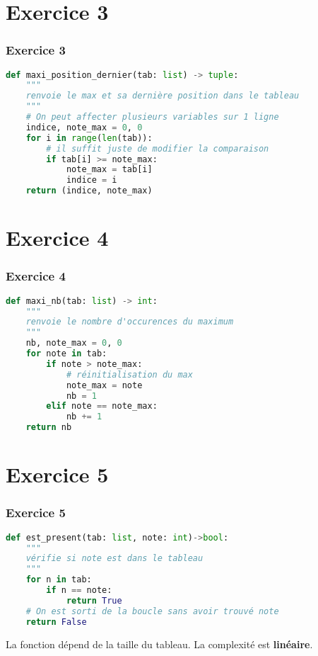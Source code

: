 \documentclass[svgnames,11pt]{beamer}
\begin{document}
\section{Exercice 3}
\begin{frame}[fragile]
    \frametitle{Exercice 3}

\begin{center}
\begin{lstlisting}[language=Python , basicstyle=\ttfamily\small, xleftmargin=2em, xrightmargin=1em]
def maxi_position_dernier(tab: list) -> tuple:
    """
    renvoie le max et sa dernière position dans le tableau
    """
    # On peut affecter plusieurs variables sur 1 ligne
    indice, note_max = 0, 0
    for i in range(len(tab)):
        # il suffit juste de modifier la comparaison
        if tab[i] >= note_max:
            note_max = tab[i]
            indice = i
    return (indice, note_max)
\end{lstlisting}
\end{center}    

\end{frame}
\section{Exercice 4}
\begin{frame}[fragile]
    \frametitle{Exercice 4}

\begin{center}
\begin{lstlisting}[language=Python , basicstyle=\ttfamily\small, xleftmargin=2em, xrightmargin=2em]
def maxi_nb(tab: list) -> int:
    """
    renvoie le nombre d'occurences du maximum
    """
    nb, note_max = 0, 0
    for note in tab:
        if note > note_max:
            # réinitialisation du max
            note_max = note
            nb = 1
        elif note == note_max:
            nb += 1
    return nb
\end{lstlisting}
\end{center}    

\end{frame}
\section{Exercice 5}
\begin{frame}[fragile]
    \frametitle{Exercice 5}

\begin{center}
\begin{lstlisting}[language=Python , basicstyle=\ttfamily\small, xleftmargin=2em, xrightmargin=2em]
def est_present(tab: list, note: int)->bool:
    """
    vérifie si note est dans le tableau
    """
    for n in tab:
        if n == note:
            return True
    # On est sorti de la boucle sans avoir trouvé note
    return False
\end{lstlisting}
\end{center}    
La fonction dépend de la taille du tableau. La complexité est \textbf{linéaire}.
\end{frame}
\end{document}
